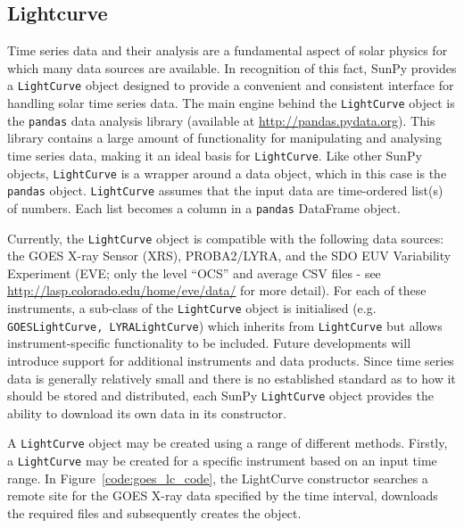 \subsection{Lightcurve}\label{ssec:lightcurve}

Time series data and their analysis are a fundamental aspect of solar
physics for which many data sources are available.  In recognition of
this fact, SunPy provides a \texttt{LightCurve} object designed to
provide a convenient and consistent interface for handling solar time
series data.  The main engine behind the \texttt{LightCurve} object is
the \texttt{pandas} data analysis library (available at
\url{http://pandas.pydata.org}).  This library contains a large amount
of functionality for manipulating and analysing time series data,
making it an ideal basis for \texttt{LightCurve}.  Like other SunPy
objects, \texttt{LightCurve} is a wrapper around a data object, which
in this case is the \texttt{pandas} object.  \texttt{LightCurve}
assumes that the input data are time-ordered list(s) of numbers.  Each
list becomes a column in a \texttt{pandas} DataFrame object.

Currently, the \texttt{LightCurve} object is compatible with the
following data sources: the GOES X-ray Sensor (XRS), PROBA2/LYRA, and
the SDO EUV Variability Experiment (EVE; only the level ``OCS'' and
average CSV files - see \url{http://lasp.colorado.edu/home/eve/data/}
for more detail).  For each of these instruments, a sub-class of the
\texttt{LightCurve} object is initialised
(e.g. \texttt{GOESLightCurve, LYRALightCurve}) which inherits from
\texttt{LightCurve} but allows instrument-specific functionality to be
included.  Future developments will introduce support for additional
instruments and data products.  Since time series data is generally
relatively small and there is no established standard as to how it
should be stored and distributed, each SunPy \texttt{LightCurve}
object provides the ability to download its own data in its
constructor.


A \texttt{LightCurve} object may be created using a range of different methods. 
Firstly, a \texttt{LightCurve} may be created for a specific instrument based 
on an input time range. In Figure~\ref{code:goes_lc_code}, 
the LightCurve constructor searches a remote site for the GOES X-ray data 
specified by the time interval, downloads the required files and subsequently 
creates the object.


